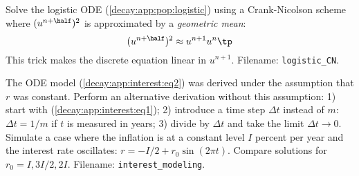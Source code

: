 \documentclass[graybox,sectrefs,envcountresetchap,open=right,final]{svmonodo}
\makeatletter
\newenvironment{doconceexercise}{}{}
\newcounter{doconceexercisecounter}%
\newcommand\listofexercises{
\chapter*{List of Exercises, Problems, and Projects
          \@mkboth{List of Exercises, Problems, and Projects}{List of Exercises, Problems, and Projects}}
\markboth{List of Exercises, Problems, and Projects}{List of Exercises, Problems, and Projects}
\@starttoc{loe}
}
\makeatother
\begin{document}
\begin{doconceexercise}

                
\label{decay:app:exer:pop:logistic1}

Solve the logistic ODE
(\ref{decay:app:pop:logistic}) using a Crank-Nicolson scheme where
$(u^{n+\half})^2$ is approximated by a \emph{geometric mean}:
\[ (u^{n+\half})^2 \approx u^{n+1}u^n
\tp
\]
This trick makes the discrete equation linear in $u^{n+1}$.
\noindent Filename: \Verb!logistic_CN!.

\end{doconceexercise}

\begin{doconceexercise}

                
\label{decay:app:exer:interest:derive}

The ODE model (\ref{decay:app:interest:eq2}) was derived under the assumption
that $r$ was constant. Perform an alternative derivation without
this assumption: 1) start with (\ref{decay:app:interest:eq1});
2) introduce a time step $\Delta t$ instead of $m$: $\Delta t = 1/m$ if
$t$ is measured in years; 3) divide by $\Delta t$ and take the
limit $\Delta t\rightarrow 0$. Simulate a case where the inflation is
at a constant level $I$ percent per year and the interest rate oscillates:
$r=-I/2 + r_0\sin(2\pi t)$.
Compare solutions for $r_0=I, 3I/2, 2I$.
\noindent Filename: \Verb!interest_modeling!.

\end{doconceexercise}
\end{document}
